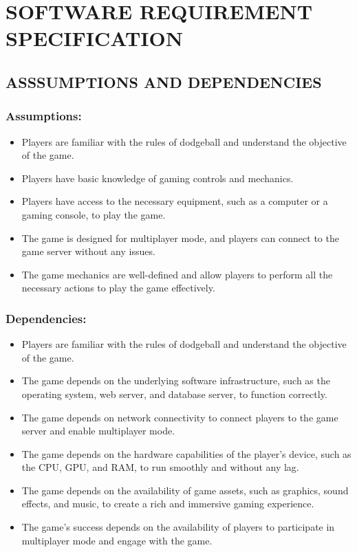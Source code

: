 \documentclass[12pt]{report}
\begin{document}
\centering
\section{SOFTWARE REQUIREMENT SPECIFICATION}
\raggedright
\subsection{ASSSUMPTIONS AND DEPENDENCIES}

\justifying
\setlength{\parindent}{4em}
\setlength{\parskip}{0.5em}
\renewcommand{\baselinestretch}{1.5}

\normalsize
\hspace{1.7cm}\subsubsection{Assumptions:}
\begin{itemize}\item Players are familiar with the rules of dodgeball and understand the objective of the game.
\item Players have basic knowledge of gaming controls and mechanics.
\item Players have access to the necessary equipment, such as a computer or a gaming console, to play the game.
\item The game is designed for multiplayer mode, and players can connect to the game server without any issues.
\item The game mechanics are well-defined and allow players to perform all the necessary actions to play the game effectively.
\end{itemize}

\hspace{1.7cm}\subsubsection{Dependencies:}
\begin{itemize}\item Players are familiar with the rules of dodgeball and understand the objective of the game.
\item The game depends on the underlying software infrastructure, such as the operating system, web server, and database server, to function correctly.
\item The game depends on network connectivity to connect players to the game server and enable multiplayer mode.
\item The game depends on the hardware capabilities of the player's device, such as the CPU, GPU, and RAM, to run smoothly and without any lag.
\item The game depends on the availability of game assets, such as graphics, sound effects, and music, to create a rich and immersive gaming experience.
\item The game's success depends on the availability of players to participate in multiplayer mode and engage with the game.
\end{itemize}
\end{document}

